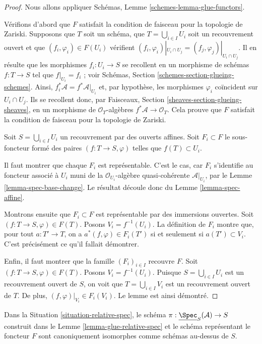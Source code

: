 \begin{proof}
Nous allons appliquer Schémas, Lemme \ref{schemes-lemma-glue-functors}.

\medskip\noindent
Vérifions d'abord que $F$ satisfait la condition de faisceau pour la
topologie de Zariski. Supposons que $T$ soit un schéma,
que $T = \bigcup_{i \in I} U_i$ soit un recouvrement ouvert
et que $(f_i, \varphi_i) \in F(U_i)$ vérifient
$(f_i, \varphi_i)|_{U_i \cap U_j} = (f_j, \varphi_j)|_{U_i \cap U_j}$.
Il en résulte que les morphismes $f_i : U_i \to S$
se recollent en un morphisme de schémas $f : T \to S$ tel que
$f|_{U_i} = f_i$ ; voir Schémas, Section \ref{schemes-section-glueing-schemes}.
Ainsi, $f_i^*\mathcal{A} = f^*\mathcal{A}|_{U_i}$ et, par hypothèse, les
morphismes $\varphi_i$ coïncident sur $U_i \cap U_j$. Ils se recollent donc,
par Faisceaux, Section \ref{sheaves-section-glueing-sheaves}, en un
morphisme de $\mathcal{O}_T$-algèbres $f^*\mathcal{A} \to \mathcal{O}_T$.
Cela prouve que $F$ satisfait la condition de faisceau pour la topologie
de Zariski.

\medskip\noindent
Soit $S = \bigcup_{i \in I} U_i$ un recouvrement par des ouverts affines.
Soit $F_i \subset F$ le sous-foncteur formé des
paires $(f : T \to S, \varphi)$ telles que
$f(T) \subset U_i$.

\medskip\noindent
Il faut montrer que chaque $F_i$ est représentable.
C'est le cas, car $F_i$ s'identifie au foncteur associé à $U_i$ muni de
la $\mathcal{O}_{U_i}$-algèbre quasi-cohérente $\mathcal{A}|_{U_i}$,
par le Lemme \ref{lemma-spec-base-change}.
Le résultat découle donc du Lemme \ref{lemma-spec-affine}.

\medskip\noindent
Montrons ensuite que $F_i \subset F$ est représentable par des immersions ouvertes.
Soit $(f : T \to S, \varphi) \in F(T)$. Posons $V_i = f^{-1}(U_i)$.
La définition de $F_i$ montre que, pour tout $a : T' \to T$,
on a $a^*(f, \varphi) \in F_i(T')$ si et seulement si $a(T') \subset V_i$.
C'est précisément ce qu'il fallait démontrer.

\medskip\noindent
Enfin, il faut montrer que la famille $(F_i)_{i \in I}$
recouvre $F$. Soit $(f : T \to S, \varphi) \in F(T)$.
Posons $V_i = f^{-1}(U_i)$. Puisque $S = \bigcup_{i \in I} U_i$
est un recouvrement ouvert de $S$, on voit que $T = \bigcup_{i \in I} V_i$
est un recouvrement ouvert de $T$. De plus, $(f, \varphi)|_{V_i} \in F_i(V_i)$.
Le lemme est ainsi démontré.
\end{proof}

\begin{lemma}
\label{lemma-glueing-gives-functor-spec}
Dans la Situation \ref{situation-relative-spec}, le schéma
$\pi : \underline{\Spec}_S(\mathcal{A}) \to S$
construit dans le Lemme \ref{lemma-glue-relative-spec} et le schéma
représentant le foncteur $F$ sont canoniquement isomorphes comme schémas
au-dessus de $S$.
\end{lemma}

